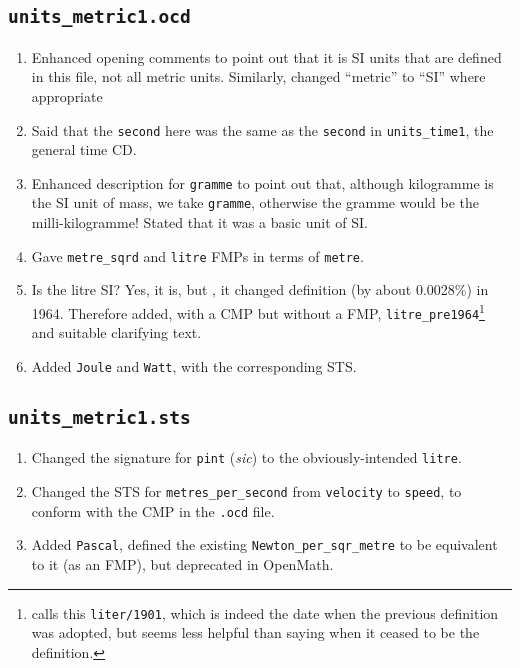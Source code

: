 \documentclass[11pt]{openmathTN}
\begin{document}
\subsection{{\tt units\_metric1.ocd}}
\begin{enumerate}
\item Enhanced opening comments to point out that it is SI units that are
defined in this file, not all metric units. Similarly, changed ``metric''
to ``SI'' where appropriate
\item Said that the {\tt second} here was the same as the {\tt second} in
\verb+units_time1+, the general time CD.
\item Enhanced description for {\tt gramme} to point out that, although
kilogramme is the SI unit of mass, we take {\tt gramme}, otherwise the
gramme would be the milli-kilogramme! Stated that it was a basic unit of
SI.
\item Gave \verb+metre_sqrd+ and \verb+litre+ FMPs in terms of {\tt metre}.
\item Is the litre SI? Yes, it is, but \cite[Section
5.3.3]{WorldWideWebConsortium2003}, it changed definition (by about
0.0028\%) in 1964. Therefore added, with a CMP but without a FMP,
\verb+litre_pre1964+\footnote{\cite[Section
5.3.3]{WorldWideWebConsortium2003} calls this {\tt liter/1901}, which is
indeed the date when the previous definition was adopted, but seems less
helpful than saying when it ceased to be the definition.} and suitable
clarifying text.
\item Added \verb+Joule+ and \verb+Watt+, with the corresponding STS.
\end{enumerate}
\subsection{{\tt units\_metric1.sts}}
\begin{enumerate}
\item Changed the signature for {\tt pint} ({\it sic}) to the
obviously-intended {\tt litre}.
\item Changed the STS for \verb+metres_per_second+ from {\tt velocity} to
{\tt speed}, to conform with the CMP in the {\tt.ocd} file.
\item Added \verb+Pascal+, defined the existing \verb+Newton_per_sqr_metre+
to be equivalent to it (as an FMP), but deprecated in OpenMath.
\end{enumerate}
\end{document}
